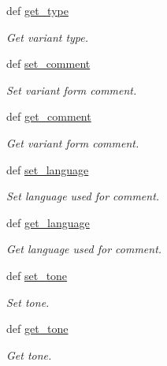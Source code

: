 \begin{DoxyCompactItemize}
def \hyperlink{classlmf_1_1src_1_1core_1_1form__representation_1_1_form_representation_a9f898af27f89d2673e8c6c70c9b3bba8}{get\+\_\+type}
\begin{DoxyCompactList}\small\item\em Get variant type. \end{DoxyCompactList}\item 
def \hyperlink{classlmf_1_1src_1_1core_1_1form__representation_1_1_form_representation_aa8c266a62f47e9085d0a3f3a4bf01212}{set\+\_\+comment}
\begin{DoxyCompactList}\small\item\em Set variant form comment. \end{DoxyCompactList}\item 
def \hyperlink{classlmf_1_1src_1_1core_1_1form__representation_1_1_form_representation_a79f6d3d638ba7f31731619f296e0be3d}{get\+\_\+comment}
\begin{DoxyCompactList}\small\item\em Get variant form comment. \end{DoxyCompactList}\item 
def \hyperlink{classlmf_1_1src_1_1core_1_1form__representation_1_1_form_representation_a0e946290f55acd1291ecef48b7b0eb3a}{set\+\_\+language}
\begin{DoxyCompactList}\small\item\em Set language used for comment. \end{DoxyCompactList}\item 
def \hyperlink{classlmf_1_1src_1_1core_1_1form__representation_1_1_form_representation_a5e45b057ff34471018b3fef4c89a4dc3}{get\+\_\+language}
\begin{DoxyCompactList}\small\item\em Get language used for comment. \end{DoxyCompactList}\item 
def \hyperlink{classlmf_1_1src_1_1core_1_1form__representation_1_1_form_representation_abec34e3beb923b2f0026bb1a4dfd4603}{set\+\_\+tone}
\begin{DoxyCompactList}\small\item\em Set tone. \end{DoxyCompactList}\item 
def \hyperlink{classlmf_1_1src_1_1core_1_1form__representation_1_1_form_representation_a58c2fa474ace9d9f98fe09f62fc1e1cc}{get\+\_\+tone}
\begin{DoxyCompactList}\small\item\em Get tone. \end{DoxyCompactList}\item 

\end{DoxyCompactItemize}
